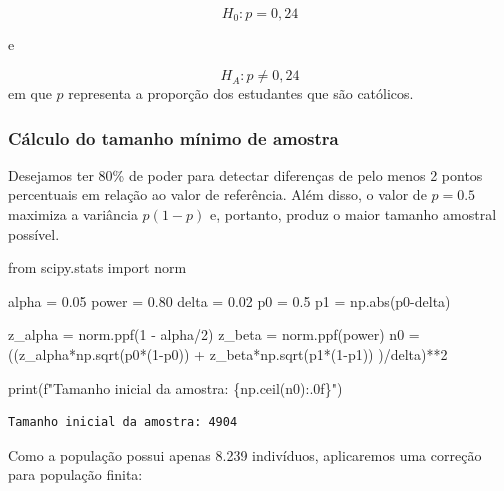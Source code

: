 \documentclass[
  letterpaper,
  DIV=11,
  numbers=noendperiod]{scrreprt}
\newenvironment{Shaded}{\begin{snugshade}}{\end{snugshade}}
\newcommand{\BuiltInTok}[1]{\textcolor[rgb]{0.00,0.23,0.31}{#1}}
\newcommand{\DecValTok}[1]{\textcolor[rgb]{0.68,0.00,0.00}{#1}}
\newcommand{\FloatTok}[1]{\textcolor[rgb]{0.68,0.00,0.00}{#1}}
\newcommand{\ImportTok}[1]{\textcolor[rgb]{0.00,0.46,0.62}{#1}}
\newcommand{\NormalTok}[1]{\textcolor[rgb]{0.00,0.23,0.31}{#1}}
\newcommand{\OperatorTok}[1]{\textcolor[rgb]{0.37,0.37,0.37}{#1}}
\newcommand{\SpecialCharTok}[1]{\textcolor[rgb]{0.37,0.37,0.37}{#1}}
\newcommand{\SpecialStringTok}[1]{\textcolor[rgb]{0.13,0.47,0.30}{#1}}
\begin{document}
\[H_0: p = 0,24\]

e

\[H_A: p \neq 0,24\] em que \(p\) representa a proporção dos estudantes
que são católicos.

\subsubsection{Cálculo do tamanho mínimo de
amostra}\label{cuxe1lculo-do-tamanho-muxednimo-de-amostra-2}

Desejamos ter 80\% de poder para detectar diferenças de pelo menos 2
pontos percentuais em relação ao valor de referência. Além disso, o
valor de \(p=0.5\) maximiza a variância \(p(1-p)\) e, portanto, produz o
maior tamanho amostral possível.

\begin{Shaded}
\begin{Highlighting}[]
\ImportTok{from}\NormalTok{ scipy.stats }\ImportTok{import}\NormalTok{ norm}

\NormalTok{alpha }\OperatorTok{=} \FloatTok{0.05} 
\NormalTok{power }\OperatorTok{=} \FloatTok{0.80} 
\NormalTok{delta }\OperatorTok{=} \FloatTok{0.02}
\NormalTok{p0 }\OperatorTok{=} \FloatTok{0.5}
\NormalTok{p1 }\OperatorTok{=}\NormalTok{ np.}\BuiltInTok{abs}\NormalTok{(p0}\OperatorTok{{-}}\NormalTok{delta)}

\NormalTok{z\_alpha }\OperatorTok{=}\NormalTok{ norm.ppf(}\DecValTok{1} \OperatorTok{{-}}\NormalTok{ alpha}\OperatorTok{/}\DecValTok{2}\NormalTok{) }
\NormalTok{z\_beta }\OperatorTok{=}\NormalTok{ norm.ppf(power) }
\NormalTok{n0 }\OperatorTok{=}\NormalTok{ ((z\_alpha}\OperatorTok{*}\NormalTok{np.sqrt(p0}\OperatorTok{*}\NormalTok{(}\DecValTok{1}\OperatorTok{{-}}\NormalTok{p0)) }\OperatorTok{+}\NormalTok{ z\_beta}\OperatorTok{*}\NormalTok{np.sqrt(p1}\OperatorTok{*}\NormalTok{(}\DecValTok{1}\OperatorTok{{-}}\NormalTok{p1)) )}\OperatorTok{/}\NormalTok{delta)}\OperatorTok{**}\DecValTok{2} 

\BuiltInTok{print}\NormalTok{(}\SpecialStringTok{f"Tamanho inicial da amostra: }\SpecialCharTok{\{}\NormalTok{np}\SpecialCharTok{.}\NormalTok{ceil(n0)}\SpecialCharTok{:.0f\}}\SpecialStringTok{"}\NormalTok{)}
\end{Highlighting}
\end{Shaded}

\begin{verbatim}
Tamanho inicial da amostra: 4904
\end{verbatim}

Como a população possui apenas 8.239 indivíduos, aplicaremos uma
correção para população finita:
\end{document}
